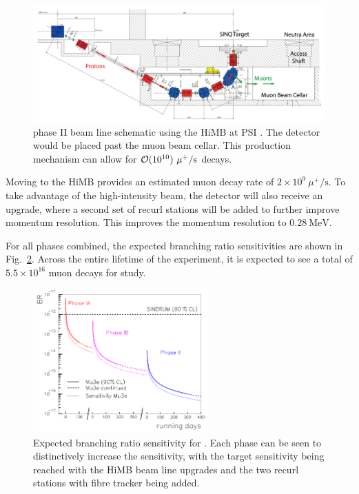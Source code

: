 \begin{figure}[h]
    \centering
    \includegraphics[width = \textwidth]{Figures/experiments/mu3e_phase2_schematic.png}
    \caption{\mueee phase II beam line schematic using the HiMB at PSI \cite{Blondel:2013ia}.
    The \mueee detector would be placed past the muon beam cellar.
    This production mechanism can allow for $\operatorname{\mathcal{O}}(10^{10})~\mu^+/\textrm{s}$ decays.}
    \label{fig:mu3e_phaseII_schematic}
\end{figure}

Moving to the HiMB provides an estimated muon decay rate of $2 \times 10^9~\mu^+/\textrm{s}$.
To take advantage of the high-intensity beam, the detector will also receive an upgrade, where a second set of recurl stations will be added to further improve momentum resolution.
This improves the momentum resolution to $0.28~\textrm{MeV}$.

For all phases combined, the expected branching ratio sensitivities are shown in Fig.~\ref{fig:mu3e_br_limits}.
Across the entire lifetime of the experiment, it is expected to see a total of $5.5 \times 10^{16}$ muon decays for study.

\begin{figure}[h]
    \centering
    \includegraphics[width = 0.6\textwidth]{Figures/experiments/mu3e_br_limits.png}
    \caption{Expected branching ratio sensitivity for \mueee \cite{Blondel:2013ia}.
    Each phase can be seen to distinctively increase the sensitivity, with the target sensitivity being reached with the HiMB beam line upgrades and the two recurl stations with fibre tracker being added.}
    \label{fig:mu3e_br_limits}
\end{figure}
